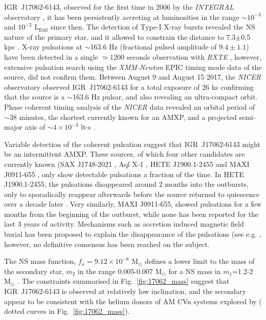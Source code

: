 \documentclass[graybox]{svmult}
\def \inte {{\em INTEGRAL\xspace}}
\def \xmm {{\em XMM-Newton\xspace}}
\def \rxte {{\em RXTE\xspace}}
\def \nicer{{\em NICER\xspace}}
\begin{document}
IGR~J17062-6143, observed for the first time in 2006 by the \inte{} observatory \cite{Churazov2007}, it has been persistently accreting at luminosities in the range $\sim10^{-3}$ and $10^{-2}$ L$_\text{Edd}$ since then. The detection of Type-I X-ray bursts \cite{Degenaar2013} revealed the NS nature of the primary star, and it allowed to constrain the distance to 7.3$\pm$0.5 kpc \cite{Keek2017}.
X-ray pulsations at $\sim$163.6 Hz (fractional pulsed amplitude of $9.4\pm1.1$) have been detected in a single $\simeq 1200$ seconds observation with \rxte{} \cite{Strohmayer2017}, however, extensive pulsation search using the \xmm{} EPIC timing mode data of the source, did not confirm them.
Between August 9 and August 15 2017, the \nicer{} observatory observed IGR~J17062-6143 for a total exposure of 26 ks confirming that the source is a $\sim$163.6 Hz pulsar, and also revealing an ultra-compact orbit. Phase coherent timing analysis of the \nicer{} data revealed an orbital period of $\sim38$ minutes, the shortest currently known for an AMXP, and a projected semi-major axis of $\sim4\times10^{-3}$ lt-s \cite{Strohmayer2018}.  

Variable detection of the coherent pulsation suggest that IGR~J17062-6143 might be an intermittent AMXP. These sources, of which four other candidates are currently known (SAX J1748-2021 \cite{Altamirano2008,Sanna2016}, Aql X-1 \cite{Casella2008}, HETE J1900.1-2455 \cite{Kaaret2006} and MAXI J0911-655 \cite{Sanna2017a}, only show detectable pulsations a fraction of the time. In HETE J1900.1-2455, the pulsations disappeared around 2 months into the outbursts, only to sporadically reappear afterwards \cite{Patruno2012a} before the source returned to quiescence over a decade later \cite{Degenaar2017b}. Very similarly, MAXI J0911-655, showed pulsations for a few months from the beginning of the outburst, while none has been reported for the last 3 years of activity. Mechanisms such as accretion induced magnetic field burial has been proposed to explain the disappearance of the pulsations (see e.g. \cite{Cumming2001}, however, no definitive consensus has been reached on the subject. 

The NS mass function, $f_x=9.12\times 10^ {-8}$ M$_\odot$ defines a lower limit to the mass of the secondary star, $m_2$ in the range 0.005-0.007 M$_\odot$ for a NS mass in $m_1$=1.2-2 M$_\odot$ \cite{Strohmayer2018}. The constraints summarised in Fig.~\ref{fig:17062_mass} suggest that IGR~J17062-6143
is observed at relatively low inclination, and the secondary appear to be consistent with the helium donors of AM CVn systems explored by \cite{Deloye2007} (
dotted curves in Fig.~\ref{fig:17062_mass}).
\end{document}
